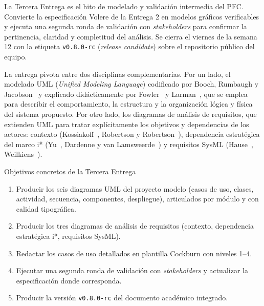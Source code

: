 \documentclass[11pt,a4paper]{article}
\begin{document}
La Tercera Entrega es el hito de modelado y validaci\'on intermedia del PFC. Convierte la especificaci\'on Volere de la Entrega 2 en modelos gr\'aficos verificables y ejecuta una segunda ronda de validaci\'on con \emph{stakeholders} para confirmar la pertinencia, claridad y completitud del an\'alisis. Se cierra el viernes de la semana 12 con la etiqueta \texttt{v0.8.0-rc} (\emph{release candidate}) sobre el repositorio p\'ublico del equipo.

La entrega pivota entre dos disciplinas complementarias. Por un lado, el modelado UML (\emph{Unified Modeling Language}) codificado por Booch, Rumbaugh y Jacobson~\cite{booch2005uml} y explicado did\'acticamente por Fowler~\cite{fowler2018uml} y Larman~\cite{larman2003uml}, que se emplea para describir el comportamiento, la estructura y la organizaci\'on l\'ogica y f\'isica del sistema propuesto. Por otro lado, los diagramas de an\'alisis de requisitos, que extienden UML para tratar expl\'icitamente los objetivos y dependencias de los actores: contexto (Kossiakoff~\cite{kossiakoff2011systems}, Robertson y Robertson~\cite{robertson2012mastering}), dependencia estrat\'egica del marco i* (Yu~\cite{yu1997istar}, Dardenne y van Lamsweerde~\cite{dardenne1993kaos}) y requisitos SysML (Hause~\cite{hause2006sysml}, Weilkiens~\cite{weilkiens2011sysml}).

\begin{cajadefinicion}{Objetivos concretos de la Tercera Entrega}
\begin{enumerate}
    \item Producir los seis diagramas UML del proyecto modelo (casos de uso, clases, actividad, secuencia, componentes, despliegue), articulados por m\'odulo y con calidad tipogr\'afica.
    \item Producir los tres diagramas de an\'alisis de requisitos (contexto, dependencia estrat\'egica i*, requisitos SysML).
    \item Redactar los casos de uso detallados en plantilla Cockburn con niveles 1--4.
    \item Ejecutar una segunda ronda de validaci\'on con \emph{stakeholders} y actualizar la especificaci\'on donde corresponda.
    \item Producir la versi\'on \texttt{v0.8.0-rc} del documento acad\'emico integrado.
\end{enumerate}
\end{cajadefinicion}

\end{document}
